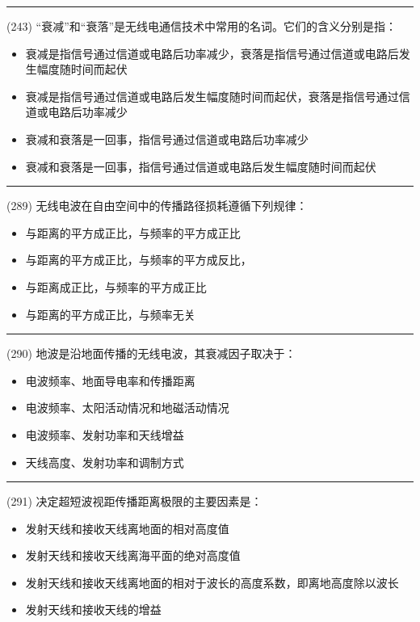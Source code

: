 \documentclass[twocolumn,hyperref,UTF8]{ctexart}  %
\begin{document}
\noindent\rule{0.5\textwidth}{1pt}
\heiti (243) “衰减”和“衰落”是无线电通信技术中常用的名词。它们的含义分别是指： \songti {\color{gray} [LK0854] }
\begin{itemize}
	\item  衰减是指信号通过信道或电路后功率减少，衰落是指信号通过信道或电路后发生幅度随时间而起伏
	\item  衰减是指信号通过信道或电路后发生幅度随时间而起伏，衰落是指信号通过信道或电路后功率减少
	\item  衰减和衰落是一回事，指信号通过信道或电路后功率减少
	\item  衰减和衰落是一回事，指信号通过信道或电路后发生幅度随时间而起伏
\end{itemize}


\noindent\rule{0.5\textwidth}{1pt}
\heiti (289) 无线电波在自由空间中的传播路径损耗遵循下列规律： \songti {\color{gray} [LK1060] }
\begin{itemize}
	\item  与距离的平方成正比，与频率的平方成正比
	\item  与距离的平方成正比，与频率的平方成反比，
	\item  与距离成正比，与频率的平方成正比
	\item  与距离的平方成正比，与频率无关
\end{itemize}


\noindent\rule{0.5\textwidth}{1pt}
\heiti (290) 地波是沿地面传播的无线电波，其衰减因子取决于： \songti {\color{gray} [LK1067] }
\begin{itemize}
	\item  电波频率、地面导电率和传播距离
	\item  电波频率、太阳活动情况和地磁活动情况
	\item  电波频率、发射功率和天线增益
	\item  天线高度、发射功率和调制方式
\end{itemize}


\noindent\rule{0.5\textwidth}{1pt}
\heiti (291) 决定超短波视距传播距离极限的主要因素是： \songti {\color{gray} [LK1068] }
\begin{itemize}
	\item  发射天线和接收天线离地面的相对高度值
	\item  发射天线和接收天线离海平面的绝对高度值
	\item  发射天线和接收天线离地面的相对于波长的高度系数，即离地高度除以波长
	\item  发射天线和接收天线的增益
\end{itemize}
\end{document}
